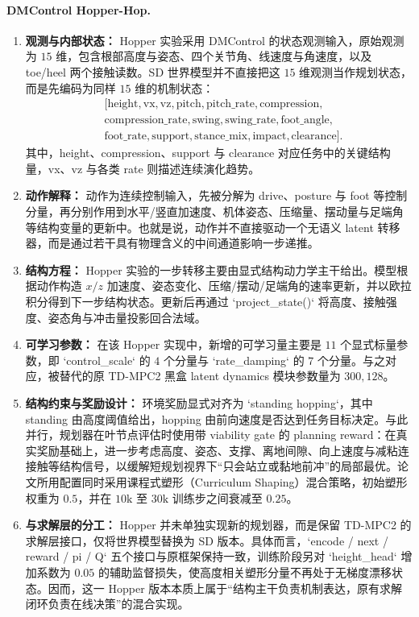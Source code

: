 \documentclass[UTF8]{ctexart}
\let\oldparagraph\paragraph
\renewcommand{\paragraph}[1]{\oldparagraph{#1}\mbox{}}
\begin{document}
\paragraph{DMControl Hopper-Hop.}
{\color{red}
\begin{enumerate}
\item \textbf{观测与内部状态：} Hopper 实验采用 DMControl 的状态观测输入，原始观测为 \(15\) 维，包含根部高度与姿态、四个关节角、线速度与角速度，以及 toe/heel 两个接触读数。SD 世界模型并不直接把这 \(15\) 维观测当作规划状态，而是先编码为同样 \(15\) 维的机制状态：
\[
\begin{aligned}
&[\text{height},\text{vx},\text{vz},\text{pitch},\text{pitch\_rate},\text{compression},\\
&\text{compression\_rate},\text{swing},\text{swing\_rate},\text{foot\_angle},\\
&\text{foot\_rate},\text{support},\text{stance\_mix},\text{impact},\text{clearance}].
\end{aligned}
\]
其中，height、compression、support 与 clearance 对应任务中的关键结构量，vx、vz 与各类 rate 则描述连续演化趋势。
\item \textbf{动作解释：} 动作为连续控制输入，先被分解为 drive、posture 与 foot 等控制分量，再分别作用到水平/竖直加速度、机体姿态、压缩量、摆动量与足端角等结构变量的更新中。也就是说，动作并不直接驱动一个无语义 latent 转移器，而是通过若干具有物理含义的中间通道影响一步递推。
\item \textbf{结构方程：} Hopper 实验的一步转移主要由显式结构动力学主干给出。模型根据动作构造 \(x/z\) 加速度、姿态变化、压缩/摆动/足端角的速率更新，并以欧拉积分得到下一步结构状态。更新后再通过 `project\_state()` 将高度、接触强度、姿态角与冲击量投影回合法域。
\item \textbf{可学习参数：} 在该 Hopper 实现中，新增的可学习量主要是 \(11\) 个显式标量参数，即 `control\_scale` 的 \(4\) 个分量与 `rate\_damping` 的 \(7\) 个分量。与之对应，被替代的原 TD-MPC2 黑盒 latent dynamics 模块参数量为 \(300{,}128\)。
\item \textbf{结构约束与奖励设计：} 环境奖励显式对齐为 `standing \times hopping`，其中 standing 由高度阈值给出，hopping 由前向速度是否达到任务目标决定。与此并行，规划器在叶节点评估时使用带 viability gate 的 planning reward：在真实奖励基础上，进一步考虑高度、姿态、支撑、离地间隙、向上速度与减粘连接触等结构信号，以缓解短规划视界下“只会站立或黏地前冲”的局部最优。论文所用配置同时采用课程式塑形（Curriculum Shaping）混合策略，初始塑形权重为 \(0.5\)，并在 \(10\text{k}\) 至 \(30\text{k}\) 训练步之间衰减至 \(0.25\)。
\item \textbf{与求解层的分工：} Hopper 并未单独实现新的规划器，而是保留 TD-MPC2 的求解层接口，仅将世界模型替换为 SD 版本。具体而言，`encode / next / reward / pi / Q` 五个接口与原框架保持一致，训练阶段另对 `height\_head` 增加系数为 \(0.05\) 的辅助监督损失，使高度相关塑形分量不再处于无梯度漂移状态。因而，这一 Hopper 版本本质上属于“结构主干负责机制表达，原有求解闭环负责在线决策”的混合实现。
\end{enumerate}
}
\end{document}
